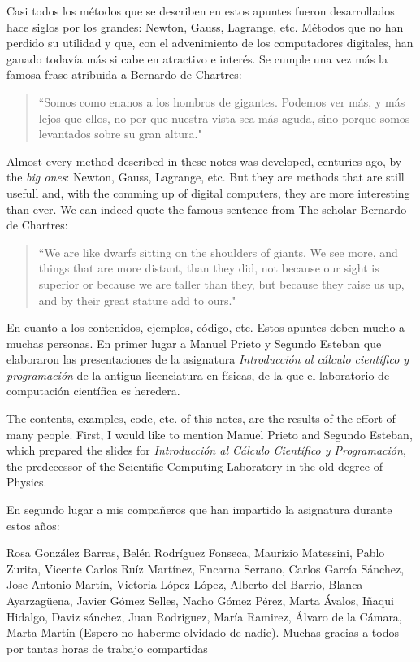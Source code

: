 \begin{paracol}{2}
\switchcolumn         
Casi todos los métodos que se describen en estos apuntes fueron desarrollados hace siglos por los grandes: Newton, Gauss, Lagrange, etc.  Métodos que no han perdido su utilidad y que, con el advenimiento de los computadores digitales, han ganado todavía más si cabe en atractivo e interés. Se cumple una vez más la famosa frase atribuida a Bernardo de Chartres:
\begin{quote}
``Somos como enanos a los hombros de gigantes. Podemos ver más, y más lejos que ellos, no por que nuestra vista sea más aguda, sino porque somos levantados sobre su gran altura."
\end{quote}
\switchcolumn
Almost every method described in these notes was developed, centuries ago, by the \emph{big ones}: Newton, Gauss, Lagrange, etc. But they are methods that are still usefull and, with the comming up of digital computers, they are more interesting than ever. We can indeed quote the famous sentence from The scholar Bernardo de Chartres:
\begin{quote}
``We are like dwarfs sitting on the shoulders of giants. We see more, and things that are more distant, than they did, not because our sight is superior or because we are taller than they, but because they raise us up, and by their great stature add to ours."
\end{quote}          

\switchcolumn
En cuanto a los contenidos, ejemplos, código, etc. Estos apuntes deben mucho a muchas personas. En primer lugar a Manuel Prieto y Segundo Esteban que elaboraron las presentaciones de la asignatura \emph{Introducción al cálculo científico y programación} de la antigua licenciatura en físicas, de la que el laboratorio de computación científica es heredera. 

\switchcolumn
The contents, examples, code, etc. of this notes, are the results of the effort of many people. First, I would like to mention  Manuel Prieto and Segundo Esteban, which prepared the slides for \emph{Introducción al Cálculo Científico y Programación}, the predecessor of the Scientific Computing Laboratory in the old degree of Physics.  

\switchcolumn
En segundo lugar a mis compañeros que han impartido la asignatura durante estos años: 

Rosa González Barras, Belén Rodríguez Fonseca, Maurizio Matessini, Pablo Zurita, Vicente Carlos Ruíz Martínez, Encarna Serrano, Carlos García Sánchez, Jose Antonio Martín, Victoria López López,  Alberto del Barrio, Blanca Ayarzagüena, Javier Gómez Selles, Nacho Gómez Pérez, Marta Ávalos, Iñaqui Hidalgo, Daviz sánchez,  Juan Rodriguez, María Ramirez, Álvaro de la Cámara, Marta Martín (Espero no haberme olvidado de nadie). Muchas gracias a todos por tantas horas de trabajo compartidas


\end{paracol}
